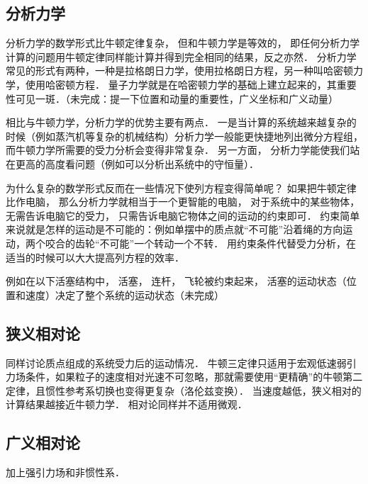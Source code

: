 \subsection{分析力学}
分析力学的数学形式比牛顿定律复杂， 但和牛顿力学是等效的， 即任何分析力学计算的问题用牛顿定律同样能计算并得到完全相同的结果，反之亦然． 分析力学常见的形式有两种，一种是拉格朗日力学，使用拉格朗日方程，另一种叫哈密顿力学，使用哈密顿方程． 量子力学就是在哈密顿力学的基础上建立起来的，其重要性可见一斑．（未完成：提一下位置和动量的重要性，广义坐标和广义动量）

相比与牛顿力学，分析力学的优势主要有两点． 一是当计算的系统越来越复杂的时候（例如蒸汽机等复杂的机械结构）分析力学一般能更快捷地列出微分方程组， 而牛顿力学所需要的受力分析会变得非常复杂． 另一方面， 分析力学能使我们站在更高的高度看问题（例如可以分析出系统中的守恒量）．

为什么复杂的数学形式反而在一些情况下使列方程变得简单呢？ 如果把牛顿定律比作电脑， 那么分析力学就相当于一个更智能的电脑， 对于系统中的某些物体， 无需告诉电脑它的受力， 只需告诉电脑它物体之间的运动的约束即可． 约束简单来说就是怎样的运动是不可能的：例如单摆中的质点就“不可能”沿着绳的方向运动，两个咬合的齿轮“不可能”一个转动一个不转． 用约束条件代替受力分析，在适当的时候可以大大提高列方程的效率．

例如在以下活塞结构中， 活塞， 连杆， 飞轮被约束起来， 活塞的运动状态（位置和速度）决定了整个系统的运动状态（未完成）%

\subsection{狭义相对论}
同样讨论质点组成的系统受力后的运动情况． 牛顿三定律只适用于宏观低速弱引力场条件，如果粒子的速度相对光速不可忽略，那就需要使用“更精确”的牛顿第二定律，且惯性参考系切换也变得更复杂（洛伦兹变换）． 当速度越低，狭义相对的计算结果越接近牛顿力学． 相对论同样并不适用微观．

\subsection{广义相对论}
加上强引力场和非惯性系．
